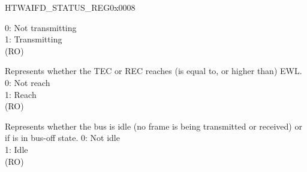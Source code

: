 \begin{register}{H}{TWAIFD\_STATUS\_REG}{0x0008}
\begin{regdesc}
\begin{reglist}
0: Not transmitting\\
1: Transmitting\\(RO)
\label{fielddesc:TWAIFDEWL}\item [TWAIFD\_EWL] Represents whether the TEC or REC reaches (is equal to, or higher than) EWL.\\
0: Not reach\\
1: Reach\\(RO)
\label{fielddesc:TWAIFDIDLE}\item [TWAIFD\_IDLE] Represents whether the bus is idle (no frame is being transmitted or received) or if \modulename is in bus-off state.
0: Not idle\\
1: Idle\\(RO)

\item [Continued on the next page...]
\end{reglist}\end{regdesc}
\end{register}

